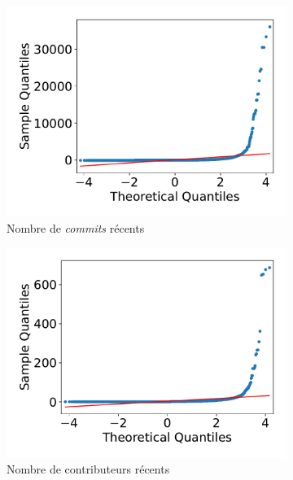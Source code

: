 \documentclass[dvipsnames]{llncs}
\begin{document}
    \begin{figure}[ht]
        \begin{subfigure}[t]{0.3\textwidth}
            \includegraphics[width=\textwidth]{../experiment/data_analysis/recentCommitCount_qqplot}
            \caption{Nombre de \emph{commits} récents}
        \end{subfigure}
        \begin{subfigure}[t]{0.3\textwidth}
            \includegraphics[width=\textwidth]{../experiment/data_analysis/recentContributorCount_qqplot}
            \caption{Nombre de contributeurs récents}
        \end{subfigure}%
        \begin{subfigure}[t]{0.3\textwidth}

\end{subfigure}
\end{figure}
\end{document}
